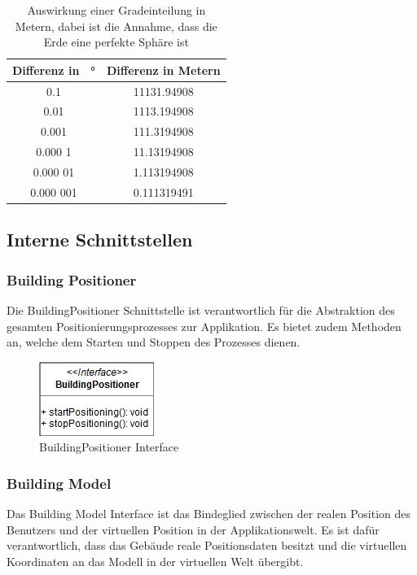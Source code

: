 \documentclass[a4paper]{scrreprt}
\begin{document}
\begin{table}[htb]
	\centering
	\begin{tabular}{|c|c|}
		\hline
		\textbf{Differenz in \SI{}{\degree}} & \textbf{Differenz in Metern}\\
		\hline
		0.1 & 11131.94908 \\
		\hline
		0.01 & 1113.194908 \\
		\hline
		0.001 & 111.3194908 \\
		\hline
		0.000 1 & 11.13194908 \\
		\hline
		0.000 01 & 1.113194908 \\
		\hline
		0.000 001 & 0.111319491 \\
		\hline
	\end{tabular} 
	\caption{Auswirkung einer Gradeinteilung in Metern, dabei ist die Annahme, dass die Erde eine perfekte Sphäre ist}
	\label{tab:GradMeter}
\end{table}

\subsection{Interne Schnittstellen}

\subsubsection{Building Positioner}
Die BuildingPositioner Schnittstelle ist verantwortlich für die Abstraktion des gesamten Positionierungsprozesses zur Applikation. Es bietet zudem Methoden an, welche dem Starten und Stoppen des Prozesses dienen.
\begin{figure}[h!]
	\center
	\includegraphics[scale=0.75]{BuildingPositioner.png}
	\caption{BuildingPositioner Interface}
\end{figure}

\clearpage
\subsubsection{Building Model}
Das Building Model Interface ist das Bindeglied zwischen der realen Position des Benutzers und der virtuellen Position in der Applikationswelt. Es ist dafür verantwortlich, dass das Gebäude reale Positionsdaten besitzt und die virtuellen Koordinaten an das Modell in der virtuellen Welt übergibt.
\end{document}
